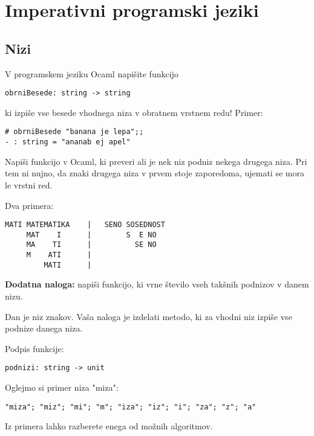 \chapter{Imperativni programski jeziki}


\section{Nizi}




\begin{ex}
V programskem jeziku Ocaml napi\v site funkcijo 
\begin{lstlisting}
obrniBesede: string -> string
\end{lstlisting}
ki izpi\v se vse besede vhodnega niza v obratnem vrstnem redu!
Primer:
\begin{lstlisting}
# obrniBesede "banana je lepa";;
- : string = "ananab ej apel"
\end{lstlisting}
\end{ex}



\begin{ex}
Napi\v si funkcijo v Ocaml, ki preveri ali je nek niz podniz nekega drugega niza. Pri tem ni nujno, da znaki drugega niza v prvem stoje zaporedoma, ujemati se mora le vrstni red.

Dva primera:                    
\begin{lstlisting}
MATI MATEMATIKA    |   SENO SOSEDNOST 
     MAT    I      |        S  E NO 
     MA    TI      |          SE NO 
     M    ATI      |
         MATI      |
\end{lstlisting}
\textbf{Dodatna naloga:} napi\v si funkcijo, ki vrne \v stevilo vseh tak\v snih podnizov v danem nizu.
\end{ex}



\begin{ex}
Dan je niz znakov. Va\v sa naloga je izdelati metodo, ki za vhodni niz izpi\v se vse podnize danega niza.

Podpis funkcije:
\begin{lstlisting}
podnizi: string -> unit 
\end{lstlisting}

Oglejmo si primer niza "miza":
\begin{lstlisting}
"miza"; "miz"; "mi"; "m"; "iza"; "iz"; "i"; "za"; "z"; "a" 
\end{lstlisting}

Iz primera lahko razberete enega od mo\v znih algoritmov.
\end{ex}




